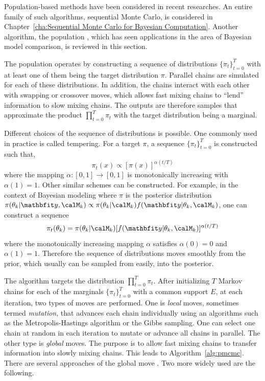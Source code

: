 Population-based methods have been considered in recent researches. An entire
family of such algorithms, sequential Monte Carlo, is considered in
Chapter~\ref{cha:Sequential Monte Carlo for Bayesian Computation}. Another
algorithm, the population \mcmc, which has seen applications in the area of
Bayesian model comparison, is reviewed in this section.

The population \mcmc operates by constructing a sequence of distributions
$\{\pi_t\}_{t=0}^T$ with at least one of them being the target distribution
$\pi$. Parallel \mcmc chains are simulated for each of these distributions. In
addition, the chains interact with each other with swapping or crossover
moves, which allows fast mixing chains to ``lend'' information to slow mixing
chains. The outputs are therefore samples that approximate the product
$\prod_{t=0}^T\pi_t$ with the target distribution being a marginal.

Different choices of the sequence of distributions is possible. One commonly
used in practice is called tempering. For a target $\pi$, a sequence
$\{\pi_t\}_{t=0}^T$ is constructed such that,
\begin{equation}
  \pi_t(x) \propto [\pi(x)]^{\alpha(t/T)}
\end{equation}
where the mapping $\alpha:[0,1]\to[0,1]$ is monotonically increasing with
$\alpha(1) = 1$. Other similar schemes can be constructed. For example, in the
context of Bayesian modeling where $\pi$ is the posterior distribution
$\pi(\theta_k|\data,\calM_k) \propto
\pi(\theta_k|\calM_k)f(\data|\theta_k,\calM_k)$, one can construct a sequence
\begin{equation}
  \pi_t(\theta_k) =
  \pi(\theta_k|\calM_k)[f(\data|\theta_k,\calM_k)]^{\alpha(t/T)}
  \label{eq:power post}
\end{equation}
where the monotonically increasing mapping $\alpha$ satisfies $\alpha(0) = 0$
and $\alpha(1) = 1$. Therefore the sequence of distributions moves smoothly
from the prior, which usually can be sampled from easily, into the posterior.

The algorithm targets the distribution $\prod_{t=0}^T\pi_t$. After
initializing $T$ Markov chains for each of the marginals $\{\pi_t\}_{t=0}^T$
with a common support $E$, at each iteration, two types of moves are
performed. One is \emph{local} moves, sometimes termed \emph{mutation}, that
advances each chain individually using an \mcmc algorithms such as the
Metropolis-Hastings algorithm or the Gibbs sampling. One can select one chain
at random in each iteration to mutate or advance all chains in parallel. The
other type is \emph{global} moves. The purpose is to allow fast mixing chains
to transfer information into slowly mixing chains. This leads to
Algorithm~\ref{alg:pmcmc}. There are several approaches of the global move
\cite{Jasra:2007in}. Two more widely used are the following.

